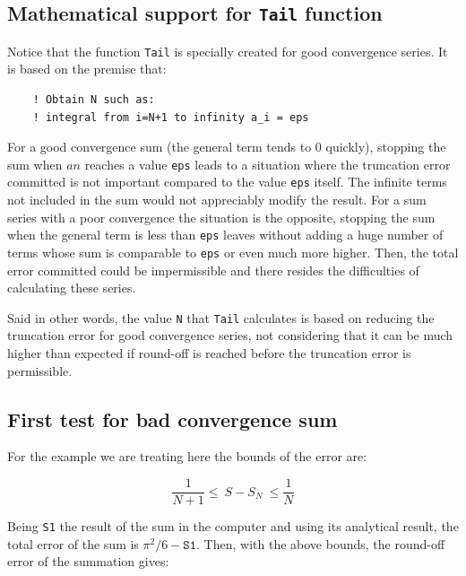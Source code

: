     \FloatBarrier
    \subsection{Mathematical support for \texttt{Tail} function}
    
Notice that the function \texttt{Tail} is specially created for good convergence series. It is based on the premise that:
\begin{verbatim} 
    ! Obtain N such as:
    ! integral from i=N+1 to infinity a_i = eps
\end{verbatim}

For a good convergence sum (the general term tends to 0 quickly), stopping the sum when $ an $ reaches a value \texttt{eps} leads to a situation 
where the truncation error committed is not important compared to the value \texttt{eps} itself. The infinite terms not included in the sum would not appreciably
modify the result. For a sum series with a poor convergence the situation is the opposite, stopping the sum when the general term is less than \texttt{eps} 
leaves without adding a huge number of terms whose sum is comparable to \texttt{eps} or even much more higher. Then, the total error committed could be impermissible 
and there resides the difficulties of calculating these series.

Said in other words, the value \texttt{N} that \texttt{Tail} calculates is based on reducing the 
truncation error for good convergence series, not considering that it can be much higher than expected 
if round-off is reached before the truncation error is permissible.

    
    
    
    
    \subsection{First test for bad convergence sum}
    
For the example we are treating here the bounds of the error are:

\begin{equation}
    \frac{1}{N+1} \le \ S - S_N \ \le \frac{1}{N}
\end{equation} 

Being \texttt{S1} the result of the sum in the computer and using its analytical result,
the total error of the sum is $ \pi^2/6 - \texttt{S1} $.
Then, with the above bounds, the round-off error of the summation gives:

